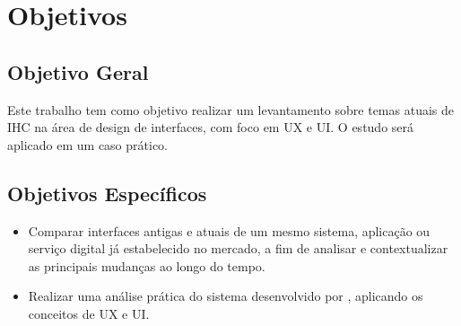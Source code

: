 
\section{Objetivos}

\subsection{Objetivo Geral}
Este trabalho tem como objetivo realizar um levantamento sobre temas atuais de \ac{IHC} na área de design de interfaces, com foco em \ac{UX} e \ac{UI}. O estudo será aplicado em um caso prático.

\subsection{Objetivos Específicos}
\begin{itemize}
    \item Comparar interfaces antigas e atuais de um mesmo sistema, aplicação ou serviço digital já estabelecido no mercado, a fim de analisar e contextualizar as principais mudanças ao longo do tempo.
    \item Realizar uma análise prática do sistema desenvolvido por , aplicando os conceitos de \ac{UX} e \ac{UI}.
\end{itemize}




